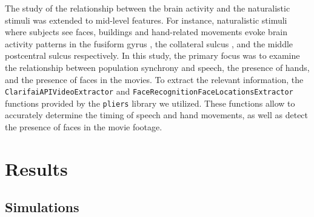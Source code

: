 The study of the relationship between the brain activity and the naturalistic
stimuli was extended to mid-level features. For instance, naturalistic stimuli
where subjects see faces, buildings and hand-related movements evoke brain
activity patterns in the fusiform gyrus
\citep{Epstein1998corticalrepresentationlocal, Haxby2000distributedhumanneural},
the collateral sulcus \citep{Aguirre1998AreaHumanVentral,
Epstein1998corticalrepresentationlocal}, and the middle postcentral sulcus
\citep{Hasson2004IntersubjectSynchronizationCortical} respectively. In this
study, the primary focus was to examine the relationship between population
synchrony and speech, the presence of hands, and the presence of faces in the
movies. To extract the relevant information, the
\texttt{ClarifaiAPIVideoExtractor} and
\texttt{FaceRecognitionFaceLocationsExtractor} functions provided by the
\texttt{pliers} library we utilized. These functions allow to accurately
determine the timing of speech and hand movements, as well as detect the
presence of faces in the movie footage.

\section{Results}
\label{sec:multi_subject_results}

\subsection{Simulations}

